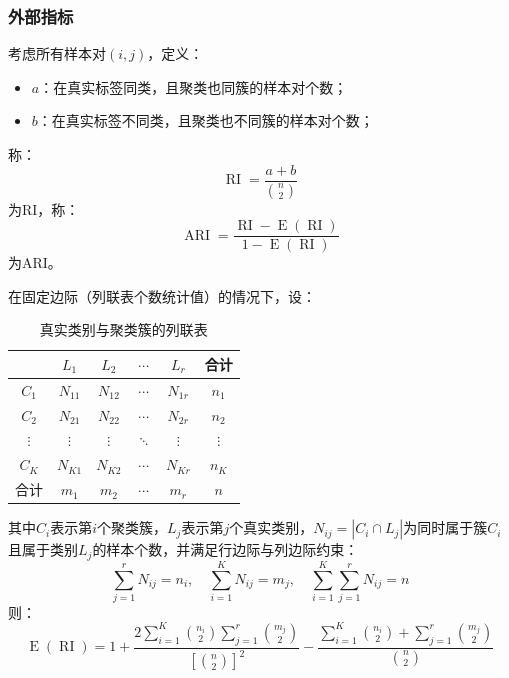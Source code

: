 \subsubsection{外部指标}
\begin{definition}
	考虑所有样本对$(i,j)$，定义：
	\begin{itemize}
		\item $a$：在真实标签同类，且聚类也同簇的样本对个数；
		\item $b$：在真实标签不同类，且聚类也不同簇的样本对个数；
	\end{itemize}
	称：
	\begin{equation*}
		\operatorname{RI}=\frac{a+b}{\binom{n}{2}}
	\end{equation*}
	为\gls{RI}，称：
	\begin{equation*}
		\operatorname{ARI}=\frac{\operatorname{RI}-\operatorname{E}(\operatorname{RI})}{1-\operatorname{E}(\operatorname{RI})}
	\end{equation*}
	为\gls{ARI}。
\end{definition}
\begin{theorem}
	在固定边际（列联表个数统计值）的情况下，设：
	\begin{table}[H]
		\centering
		\caption{真实类别与聚类簇的列联表}
		\begin{tabular}{c|cccc|c}
			\hline
			& $L_1$ & $L_2$ & $\cdots$ & $L_r$ & 合计 \\ \hline
			$C_1$ & $N_{11}$ & $N_{12}$ & $\cdots$ & $N_{1r}$ & $n_1$ \\
			$C_2$ & $N_{21}$ & $N_{22}$ & $\cdots$ & $N_{2r}$ & $n_2$ \\
			$\vdots$ & $\vdots$ & $\vdots$ & $\ddots$ & $\vdots$ & $\vdots$ \\
			$C_K$ & $N_{K1}$ & $N_{K2}$ & $\cdots$ & $N_{Kr}$ & $n_K$ \\ \hline
			合计 & $m_1$ & $m_2$ & $\cdots$ & $m_r$ & $n$ \\ \hline
		\end{tabular}
	\end{table}
	其中$C_i$表示第$i$个聚类簇，$L_j$表示第$j$个真实类别，$N_{ij}=|C_i\cap L_j|$为同时属于簇$C_i$且属于类别$L_j$的样本个数，并满足行边际与列边际约束：
	\begin{equation*}
		\sum_{j=1}^rN_{ij}=n_i,\quad
		\sum_{i=1}^KN_{ij}=m_j,\quad
		\sum_{i=1}^K\sum_{j=1}^rN_{ij}=n
	\end{equation*}
	则：
	\begin{equation*}
		\operatorname{E}(\operatorname{RI})=1+\frac{2\sum\limits_{i=1}^{K}\binom{n_i}{2}\sum\limits_{j=1}^{r}\binom{m_j}{2}}{[\binom{n}{2}]^2}-\frac{\sum\limits_{i=1}^{K}\binom{n_i}{2}+\sum\limits_{j=1}^{r}\binom{m_j}{2}}{\binom{n}{2}}
	\end{equation*}
\end{theorem}
